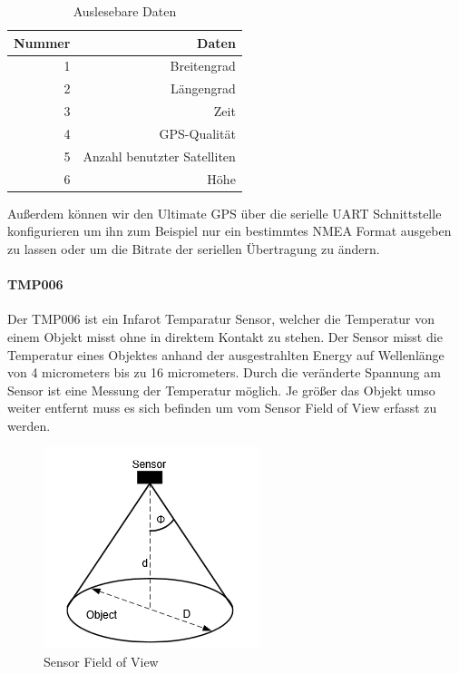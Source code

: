 \begin{table}[H]
  \centering
    \begin{tabular}{rr}
    \toprule
    \textbf{Nummer} & \textbf{Daten} \\
    \midrule 
    1 & Breitengrad \\
    2 & Längengrad \\
    3 & Zeit \\
    4 & GPS-Qualität \\
    5 & Anzahl benutzter Satelliten \\
    6 & Höhe \\
    \bottomrule
    \end{tabular}
    \caption{Auslesebare Daten}
\end{table}

Außerdem können wir den Ultimate GPS über die serielle UART Schnittstelle konfigurieren um ihn zum Beispiel nur ein bestimmtes NMEA Format ausgeben zu lassen oder um die Bitrate der seriellen Übertragung zu ändern.

\paragraph{TMP006}
Der TMP006 ist ein Infarot Temparatur Sensor, welcher die Temperatur von einem Objekt misst ohne in direktem Kontakt zu stehen. Der Sensor misst die Temperatur eines Objektes anhand der ausgestrahlten Energy auf Wellenlänge von 4 micrometers bis zu 16 micrometers. Durch die veränderte Spannung am Sensor ist eine Messung der Temperatur möglich. Je größer das Objekt umso weiter entfernt muss es sich befinden um vom Sensor Field of View erfasst zu werden.

\begin{figure}[h]
	\centering
	\includegraphics[scale=0.5]{2_Beschreibung_des_CANSAT/sensor_fov.png}
	\caption{Sensor Field of View}
	\label{sensor fov}
\end{figure}

